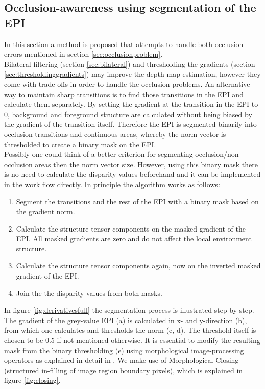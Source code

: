 \documentclass  [
  paper    = a4,
  BCOR     = 10mm,
  twoside,
  fontsize = 12pt,
  fleqn,
  toc      = bibnumbered,
  toc      = listofnumbered,
  numbers  = noendperiod,
  headings = normal,
  listof   = leveldown,
  version  = 3.03
]                                       {scrreprt}
\begin{document}
 \subsection{Occlusion-awareness using segmentation of the EPI}
 \label{sec:occlusionsegmentation}
 In this section a method is proposed that attempts to handle both occlusion errors mentioned in section \ref{sec:occlusionproblem}.\\
 Bilateral filtering (section \ref{sec:bilateral}) and thresholding the gradients (section \ref{sec:thresholdinggradients}) may improve the depth map estimation, however they come with trade-offs in order to handle the occlusion problems. An alternative way to maintain sharp transitions is to find those transitions in the EPI and calculate them separately. By setting the gradient at the transition in the EPI to 0, background and foreground structure are calculated without being biased by the gradient of the transition itself. Therefore the EPI is segmented binarily into occlusion transitions and continuous areas, whereby the norm vector is thresholded to create a binary mask on the EPI. \\
 Possibly one could think of a better criterion for segmenting occlusion/non-occlusion areas then the norm vector size. However, using this binary mask there is no need to calculate the disparity values beforehand and it can be implemented in the work flow directly. In principle the algorithm works as follows:
 \begin{enumerate}
 	\item Segment the transitions and the rest of the EPI with a binary mask based on the gradient norm.
 	\item Calculate the structure tensor components on the masked gradient of the EPI. All masked gradients are zero and do not affect the local environment structure.
 	\item Calculate the structure tensor components again, now on the inverted masked gradient of the EPI.
 	\item Join the the disparity values from both masks.
 \end{enumerate}
 In figure \ref{fig:derivativesfull} the segmentation process is illustrated step-by-step. The gradient of the grey-value EPI (a) is calculated in x- and y-direction (b), from which one calculates and thresholds the norm (c, d). The threshold itself is chosen to be 0.5 if not mentioned otherwise. It is essential to modify the resulting mask from the binary thresholding (e) using morphological image-processing operators as explained in detail in \cite{homepages.inf.ed.ac.uk}. We make use of Morphological Closing (structured in-filling of image region boundary pixels), which is explained in figure \ref{fig:closing}.\\
\end{document}
